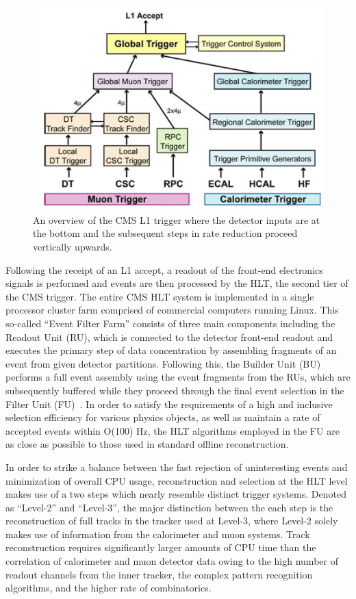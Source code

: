 \begin{figure}
  \centering
  \includegraphics[width=\textwidth]{figs/trigger2}
  \caption{An overview of the CMS L1 trigger where the detector inputs are at the bottom and the subsequent steps in rate reduction proceed vertically upwards.}
  \label{fig:L1T}
\end{figure}

Following the receipt of an L1 accept, a readout of the front-end electronics signals is performed and events are then processed by the HLT, the second tier of the CMS trigger. The entire CMS HLT system is implemented in a single processor cluster farm comprised of commercial computers running Linux. This so-called ``Event Filter Farm'' consists of three main components including the Readout Unit (RU), which is connected to the detector front-end readout and executes the primary step of data concentration by assembling fragments of an event from given detector partitions. Following this, the Builder Unit (BU) performs a full event assembly using the event fragments from the RUs, which are subsequently buffered while they proceed through the final event selection in the Filter Unit (FU)~\cite{Andre}. In order to satisfy the requirements of a high and inclusive selection efficiency for various physics objects, as well as maintain a rate of accepted events within O(100) Hz, the HLT algorithms employed in the FU are as close as possible to those used in standard offline reconstruction. 

In order to strike a balance between the fast rejection of uninteresting events and minimization of overall CPU usage, reconstruction and selection at the HLT level makes use of a two steps which nearly resemble distinct trigger systems. Denoted as ``Level-2'' and ``Level-3'', the major distinction between the each step is the reconstruction of full tracks in the tracker used at Level-3, where Level-2 solely makes use of information from the calorimeter and muon systems. Track reconstruction requires significantly larger amounts of CPU time than the correlation of calorimeter and muon detector data owing to the high number of readout channels from the inner tracker, the complex pattern recognition algorithms, and the higher rate of combinatorics. 

